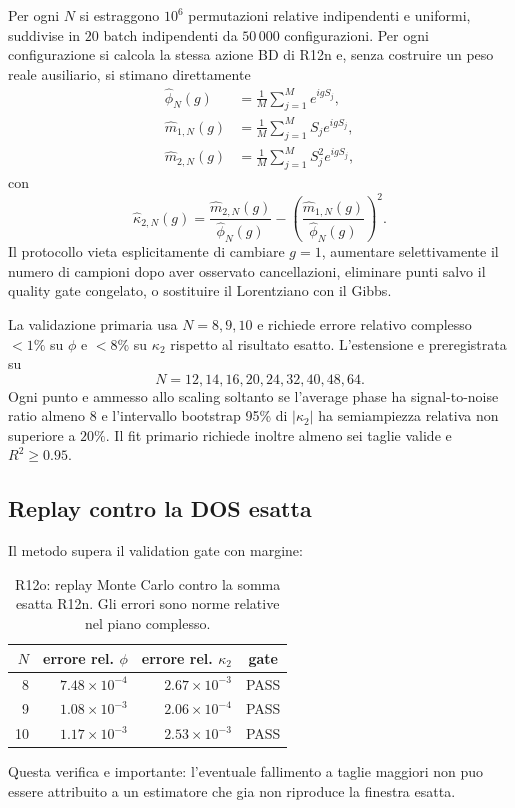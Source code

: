 \documentclass[11pt,a4paper]{article}
\begin{document}
Per ogni $N$ si estraggono $10^6$ permutazioni relative indipendenti e uniformi, suddivise in $20$ batch indipendenti da $50\,000$ configurazioni. Per ogni configurazione si calcola la stessa azione BD di R12n e, senza costruire un peso reale ausiliario, si stimano direttamente
\begin{align}
 \widehat\phi_N(g)&=\frac{1}{M}\sum_{j=1}^{M}e^{igS_j},\\
 \widehat m_{1,N}(g)&=\frac{1}{M}\sum_{j=1}^{M}S_j e^{igS_j},\\
 \widehat m_{2,N}(g)&=\frac{1}{M}\sum_{j=1}^{M}S_j^2 e^{igS_j},
\end{align}
con
\begin{equation}
 \widehat\kappa_{2,N}(g)=
 \frac{\widehat m_{2,N}(g)}{\widehat\phi_N(g)}-
 \left(\frac{\widehat m_{1,N}(g)}{\widehat\phi_N(g)}\right)^2.
 \label{eq:r12o_mc_kappa}
\end{equation}
Il protocollo vieta esplicitamente di cambiare $g=1$, aumentare selettivamente il numero di campioni dopo aver osservato cancellazioni, eliminare punti salvo il quality gate congelato, o sostituire il Lorentziano con il Gibbs.

La validazione primaria usa $N=8,9,10$ e richiede errore relativo complesso $<1\%$ su $\phi$ e $<8\%$ su $\kappa_2$ rispetto al risultato esatto. L'estensione e preregistrata su
\begin{equation}
 N=12,14,16,20,24,32,40,48,64.
\end{equation}
Ogni punto e ammesso allo scaling soltanto se l'average phase ha signal-to-noise ratio almeno $8$ e l'intervallo bootstrap 95\% di $|\kappa_2|$ ha semiampiezza relativa non superiore a $20\%$. Il fit primario richiede inoltre almeno sei taglie valide e $R^2\ge0.95$.

\subsection{Replay contro la DOS esatta}

Il metodo supera il validation gate con margine:
\begin{table}[htbp]
\centering
\caption{R12o: replay Monte Carlo contro la somma esatta R12n. Gli errori sono norme relative nel piano complesso.}
\begin{tabular}{r r r c}
\toprule
$N$ & errore rel. $\phi$ & errore rel. $\kappa_2$ & gate\\
\midrule
8  & $7.48\times10^{-4}$ & $2.67\times10^{-3}$ & PASS\\
9  & $1.08\times10^{-3}$ & $2.06\times10^{-4}$ & PASS\\
10 & $1.17\times10^{-3}$ & $2.53\times10^{-3}$ & PASS\\
\bottomrule
\end{tabular}
\end{table}
Questa verifica e importante: l'eventuale fallimento a taglie maggiori non puo essere attribuito a un estimatore che gia non riproduce la finestra esatta.
\end{document}
